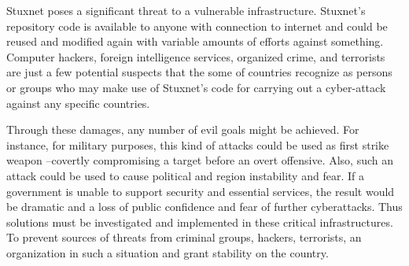 \documentclass[conference]{IEEEtran}
\begin{document}
Stuxnet poses a significant threat to a vulnerable infrastructure. Stuxnet’s repository code is available to anyone with connection to internet and could be reused and modified again with variable amounts of efforts against something. Computer hackers, foreign intelligence services, organized crime, and terrorists are just a few potential suspects that the some of countries recognize as persons or groups who may make use of Stuxnet’s code for carrying out a cyber-attack against any specific countries.

Through these damages, any number of evil goals might be achieved. For instance, for military purposes, this kind of attacks could be used as first strike weapon –covertly compromising a target before an overt offensive. Also, such an attack could be used to cause political and region instability and  fear. If a government is unable to support security and essential services, the result would be dramatic and a loss of public confidence and fear of further cyberattacks. Thus solutions must be investigated and implemented in these critical infrastructures. To prevent sources of threats from criminal groups, hackers, terrorists, an organization in such a situation and grant stability on the country.


    
\end{document}
